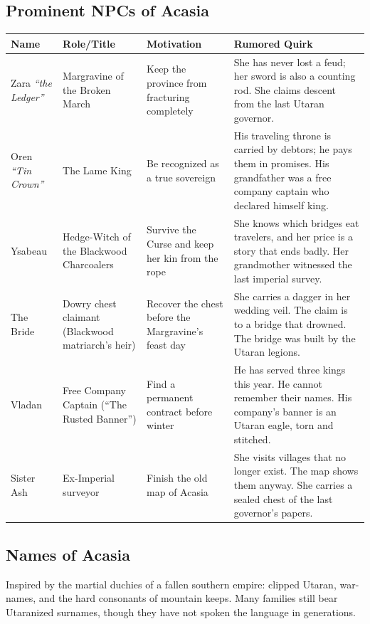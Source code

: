 \subsection*{Prominent NPCs of Acasia}
\label{sec:acasia-npcs}

\begin{longtable}{|p{}|p{}|p{}|p{}|}
\hline
\textbf{Name} & \textbf{Role/Title} & \textbf{Motivation} & \textbf{Rumored Quirk} \\
\hline
Zara \textit{``the Ledger''} & Margravine of the Broken March & Keep the province from fracturing completely & She has never lost a feud; her sword is also a counting rod. She claims descent from the last Utaran governor. \\
\hline
Oren \textit{``Tin Crown''} & The Lame King & Be recognized as a true sovereign & His traveling throne is carried by debtors; he pays them in promises. His grandfather was a free company captain who declared himself king. \\
\hline
Ysabeau & Hedge-Witch of the Blackwood Charcoalers & Survive the Curse and keep her kin from the rope & She knows which bridges eat travelers, and her price is a story that ends badly. Her grandmother witnessed the last imperial survey. \\
\hline
The Bride & Dowry chest claimant (Blackwood matriarch's heir) & Recover the chest before the Margravine's feast day & She carries a dagger in her wedding veil. The claim is to a bridge that drowned. The bridge was built by the Utaran legions. \\
\hline
Vladan & Free Company Captain (``The Rusted Banner'') & Find a permanent contract before winter & He has served three kings this year. He cannot remember their names. His company's banner is an Utaran eagle, torn and stitched. \\
\hline
Sister Ash & Ex-Imperial surveyor & Finish the old map of Acasia & She visits villages that no longer exist. The map shows them anyway. She carries a sealed chest of the last governor's papers. \\
\hline
\end{longtable}

\subsection*{Names of Acasia}
\label{sec:acasia-names}

Inspired by the martial duchies of a fallen southern empire: clipped Utaran, war-names, and the hard consonants of mountain keeps. Many families still bear Utaranized surnames, though they have not spoken the language in generations.

